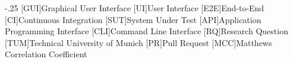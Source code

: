 
\begin{acronym}
    \itemsep-.25\baselineskip
    [GUI]{Graphical User Interface}
    [UI]{User Interface}
    [E2E]{End-to-End}
    [CI]{Continuous Integration}
    [SUT]{System Under Test}
    [API]{Application Programming Interface}
    [CLI]{Command Line Interface}
    [RQ]{Research Question}
    [TUM]{Technical University of Munich}
    [PR]{Pull Request}
    [MCC]{Matthews Correlation Coefficient}
\end{acronym}
